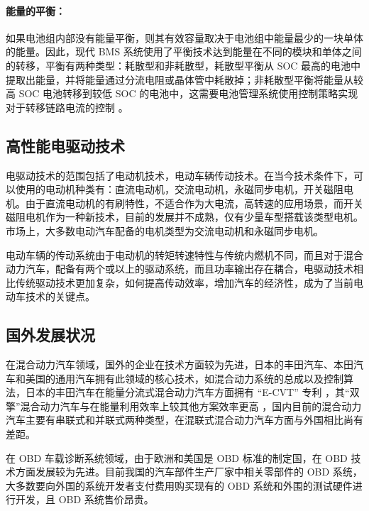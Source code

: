\paragraph*{能量的平衡：}如果电池组内部没有能量平衡，则其有效容量取决于电池组中能量最少的一块单体的能量。因此，现代 BMS 系统使用了平衡技术达到能量在不同的模块和单体之间的转移，平衡有两种类型：耗散型和非耗散型，耗散型平衡从 SOC 最高的电池中提取出能量，并将能量通过分流电阻或晶体管中耗散掉；非耗散型平衡将能量从较高 SOC 电池转移到较低 SOC 的电池中，这需要电池管理系统使用控制策略实现对于转移链路电流的控制 \cite{兰祥2017无人机锂电池组平衡充电技术的研究}。

\subsection{高性能电驱动技术}
电驱动技术的范围包括了电动机技术，电动车辆传动技术。在当今技术条件下，可以使用的电动机种类有：直流电动机，交流电动机，永磁同步电机，开关磁阻电机。由于直流电动机的有刷特性，不适合作为大电流，高转速的应用场景，而开关磁阻电机作为一种新技术，目前的发展并不成熟，仅有少量车型搭载该类型电机。市场上，大多数电动汽车配备的电机类型为交流电动机和永磁同步电机。

电动车辆的传动系统由于电动机的转矩转速特性与传统内燃机不同，而且对于混合动力汽车，配备有两个或以上的驱动系统，而且功率输出存在耦合，电驱动技术相比传统驱动技术更加复杂，如何提高传动效率，增加汽车的经济性，成为了当前电动车技术的关键点。

\subsection{国外发展状况}
在混合动力汽车领域，国外的企业在技术方面较为先进，日本的丰田汽车、本田汽车和美国的通用汽车拥有此领域的核心技术，如混合动力系统的总成以及控制算法，日本的丰田汽车在能量分流式混合动力汽车方面拥有 “E-CVT” 专利 ，其“双擎”混合动力汽车与在能量利用效率上较其他方案效率更高 \cite{2006E-CVTHYBRIDTRANSMISSION}，国内目前的混合动力汽车主要有串联式和并联式两种类型，在混联式混合动力汽车方面与外国相比尚有差距。

在 OBD 车载诊断系统领域，由于欧洲和美国是 OBD 标准的制定国，在 OBD 技术方面发展较为先进。目前我国的汽车部件生产厂家中相关零部件的 OBD 系统，大多数要向外国的系统开发者支付费用购买现有的 OBD 系统和外围的测试硬件进行开发，且 OBD 系统售价昂贵。